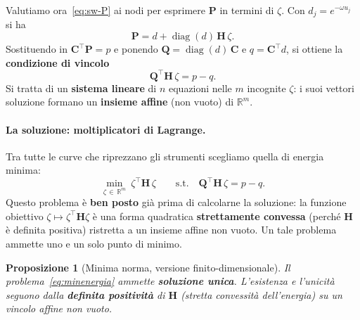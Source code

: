 \documentclass[11pt,a4paper]{article}
\theoremstyle{plain}
\newtheorem{proposizione}[teorema]{Proposizione}
\theoremstyle{definition}
\theoremstyle{remark}
\newcommand{\Qmat}{\mathbf{Q}}
\newcommand{\Hmat}{\mathbf{H}}
\newcommand{\transp}{^{\!\top}}
\begin{document}
Valutiamo ora~\eqref{eq:sw-P} ai nodi per esprimere $\mathbf{P}$ in termini di $\zeta$.
Con $d_j = e^{-\omega u_j}$ si ha
\[
  \mathbf{P} = d + \operatorname{diag}(d)\,\Hmat\,\zeta .
\]
Sostituendo in $\mathbf{C}\transp \mathbf{P} = p$ e ponendo
$\Qmat = \operatorname{diag}(d)\,\mathbf{C}$ e $q = \mathbf{C}\transp d$, si ottiene la
\textbf{condizione di vincolo}
\begin{equation}
  \Qmat\transp \Hmat\, \zeta = p - q .
  \label{eq:vincolo}
\end{equation}
Si tratta di un \textbf{sistema lineare} di $n$ equazioni nelle $m$ incognite $\zeta$:
i suoi vettori soluzione formano un \textbf{insieme affine} (non vuoto) di $\mathbb{R}^m$.

\paragraph{La soluzione: moltiplicatori di Lagrange.}
Tra tutte le curve che riprezzano gli strumenti scegliamo quella di energia minima:
\begin{equation}
  \min_{\zeta\,\in\,\mathbb{R}^m} \ \zeta\transp \Hmat\, \zeta
  \qquad \text{s.t.}\quad
  \Qmat\transp \Hmat\, \zeta = p - q .
  \label{eq:minenergia}
\end{equation}
Questo problema \`e \textbf{ben posto} gi\`a prima di calcolarne la soluzione: la funzione
obiettivo $\zeta\mapsto\zeta\transp\Hmat\zeta$ \`e una forma quadratica
\textbf{strettamente convessa} (perch\'e $\Hmat$ \`e definita positiva) ristretta a un
insieme affine non vuoto. Un tale problema ammette uno e un solo punto di minimo.

\begin{proposizione}[Minima norma, versione finito-dimensionale]
\label{prop:minnorm-finita}
Il problema~\eqref{eq:minenergia} ammette \textbf{soluzione unica}. L'esistenza e
l'unicit\`a seguono dalla \textbf{definita positivit\`a} di $\Hmat$ (stretta
convessit\`a dell'energia) su un vincolo affine non vuoto.
\end{proposizione}
\end{document}
